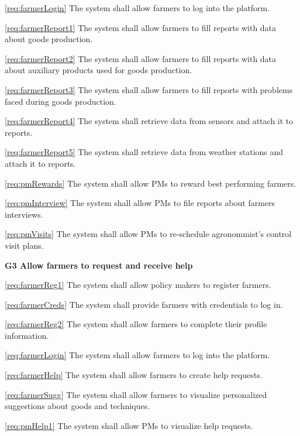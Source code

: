 \documentclass[10pt]{article}
\begin{document}
\begin{description}
\begin{description}
            \item \ref{req:farmerLogin} The system shall allow farmers to log into the platform.
            \item \ref{req:farmerReport1} The system shall allow farmers to fill reports with data about goods production.
            \item \ref{req:farmerReport2} The system shall allow farmers to fill reports with data about auxiliary products used for goods production.
            \item \ref{req:farmerReport3} The system shall allow farmers to fill reports with problems faced during goods production.
            \item \ref{req:farmerReport4} The system shall retrieve data from sensors and attach it to reports.
            \item \ref{req:farmerReport5} The system shall retrieve data from weather stations and attach it to reports.
            \item \ref{req:pmRewards} The system shall allow PMs to reward best performing farmers.
            \item \ref{req:pmInterview} The system shall allow PMs to file reports about farmers interviews.
            \item \ref{req:pmVisits} The system shall allow PMs to re-schedule agronommist's control visit plans.
        \end{description}
    \item \textbf{G3 Allow farmers to request and receive help}
        \begin{description}
            \item \ref{req:farmerReg1} The system shall allow policy makers to register farmers.    
            \item \ref{req:farmerCreds} The system shall provide farmers with credentials to log in.    
            \item \ref{req:farmerReg2} The system shall allow farmers to complete their profile information.    
            \item \ref{req:farmerLogin} The system shall allow farmers to log into the platform.
            \item \ref{req:farmerHelp} The system shall allow farmers to create help requests.     
            \item \ref{req:farmerSugg} The system shall allow farmers to visualize personalized suggestions about goods and techniques. 
            \item \ref{req:pmHelp1} The system shall allow PMs to visualize help requests.

\end{description}
\end{description}
\end{document}
